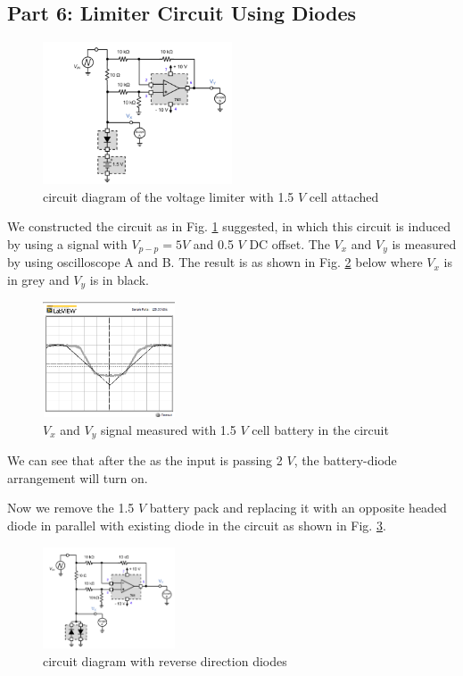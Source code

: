 \documentclass[letterpaper, 10 pt, conference]{ieeeconf}  %
\begin{document}
\subsection{Part 6: Limiter Circuit Using Diodes}
\begin{figure}[ht]
  \centering
  \includegraphics[width=0.5\textwidth]{images/6_1.png}
  \caption{circuit diagram of the voltage limiter with 1.5 $V$ cell attached}
  \label{fig:6.1}
\end{figure}
We constructed the circuit as in Fig. \ref{fig:6.1} suggested, in which
this circuit is induced by using a signal with $V_{p-p} = 5 V$ and 0.5 $V$ DC offset.
The $V_{x}$ and $V_{y}$ is measured by using oscilloscope A and B. The result is
as shown in Fig. \ref{fig:6.2} below where $V_{x}$ is in grey and $V_{y}$ is in black.
\begin{figure}[ht]
  \centering
  \includegraphics[width=0.35\textwidth]{images/6_2.png}
  \caption{$V_{x}$ and $V_{y}$ signal measured with 1.5 $V$ cell battery in the circuit}
  \label{fig:6.2}
\end{figure}
\par We can see that after the as the input is passing 2 $V$, the battery-diode arrangement will turn on.
\par Now we remove the 1.5 $V$ battery pack and replacing it with an opposite
headed diode in parallel with existing diode in the circuit as shown in  Fig. \ref{fig:6.3}.
\begin{figure}[ht]
  \centering
  \includegraphics[width=0.35\textwidth]{images/6_3.png}
  \caption{circuit diagram with reverse direction diodes}
  \label{fig:6.3}
\end{figure}
\end{document}
